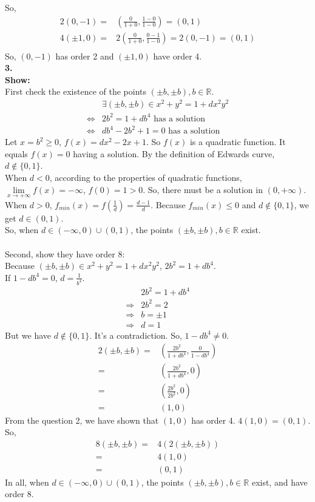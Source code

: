 \documentclass[
	12pt, %
]{fphw}
\begin{document}
So,
\begin{align*}
	2(0,-1)=&(\frac{0}{1+0},\frac{1-0}{1-0})=(0,1)\\
	4(\pm1,0)=&2(\frac{0}{1+0},\frac{0-1}{1-0})=2(0,-1)=(0,1)\\
\end{align*}
So, $(0,-1)$ has order 2 and $(\pm1,0)$ have order 4.\\
\textbf{3.}\\
\textbf{Show:\\}
First check the existence of the points $(\pm b,\pm b), b\in\mathbb{R}$.
\begin{align*}
	&\exists(\pm b,\pm b)\in x^2+y^2=1+dx^2y^2\\
	\Leftrightarrow&2b^2=1+db^4 \text{ has a solution}\\
	\Leftrightarrow&db^4-2b^2+1=0 \text{ has a solution}
\end{align*}
Let $x=b^2\geq0$, $f(x)=dx^2-2x+1$. So $f(x)$ is a quadratic function. It equals $f(x)=0$ having a solution. By the definition of Edwards curve, $d\not\in\{0,1\}$.\\
When $d<0$, according to the properties of quadratic functions, $\lim\limits_{x\to+\infty}f(x)=-\infty$, $f(0)=1>0$. So, there must be a solution in $(0,+\infty)$.\\
When $d>0$, $f_{min}(x)=f(\frac{1}{d})=\frac{d-1}{d}$. Because $f_{min}(x)\leq0$ and $d\not\in\{0,1\}$, we get $d\in(0,1)$.\\
So, when $d\in(-\infty,0)\cup(0,1)$, the points $(\pm b,\pm b), b\in\mathbb{R}$ exist.\\
\\
Second, show they have order 8:\\
Because $(\pm b,\pm b)\in x^2+y^2=1+dx^2y^2$, $2b^2=1+db^4$.\\
If $1-db^4=0$, $d=\frac{1}{b^4}$. 
\begin{align*}
	&2b^2=1+db^4\\
	\Rightarrow&2b^2=2\\
	\Rightarrow&b=\pm1\\
	\Rightarrow&d=1
\end{align*}
But we have $d\not\in\{0,1\}$. It's a contradiction. So, $1-db^4\not=0$.
\begin{align*}
	2(\pm b,\pm b)=&(\frac{2b^2}{1+db^4},\frac{0}{1-db^4})\\
	=&(\frac{2b^2}{1+db^4},0)\\
	=&(\frac{2b^2}{2b^2},0)\\
	=&(1,0)
\end{align*}
From the question 2, we have shown that $(1,0)$ has order 4. $4(1,0)=(0,1)$. So,
\begin{align*}
	8(\pm b,\pm b)=&4(2(\pm b,\pm b))\\
	=&4(1,0)\\
	=&(0,1)
\end{align*}
In all, when $d\in(-\infty,0)\cup(0,1)$, the points $(\pm b,\pm b), b\in\mathbb{R}$ exist, and have order 8.
\end{document}
